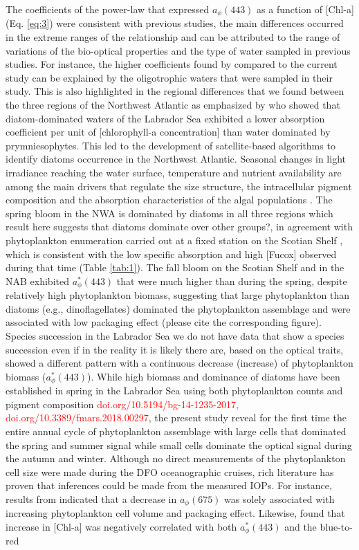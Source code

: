 \documentclass[utf8]{frontiersSCNS} %
\begin{document}
The coefficients of the power-law that expressed $a_\phi(443)$ as a function of [Chl-a] (Eq. \ref{eq:3}) were consistent with previous studies, the main differences occurred in the extreme ranges of the relationship and can be attributed to the range of variations of the bio-optical properties and the type of water sampled in previous studies. For instance, the higher coefficients found by \cite{bricaud2005} compared to the current study can be explained by the oligotrophic waters that were sampled in their study. This is also highlighted in the regional differences that we found between the three regions of the Northwest Atlantic as emphasized by \cite{stuart2000} who showed that diatom-dominated waters of the Labrador Sea exhibited a lower absorption coefficient per unit of [chlorophyll-a concentration] than water dominated by prymniesophytes. This led to the development of satellite-based algorithms to identify diatoms occurrence \citep{sathyendranath2004} in the Northwest Atlantic. Seasonal changes in light irradiance reaching the water surface, temperature and nutrient availability are among the main drivers that regulate the size structure, the intracellular pigment composition and the absorption characteristics of the algal populations \citep{Ciotti2002,Bricaud2004,Churilova2017}.  The spring bloom in the NWA is dominated by diatoms in all three regions which result here suggests that diatoms dominate over other groups?, in agreement with phytoplankton enumeration carried out at a fixed station on the Scotian Shelf \citep{casault2020}, which is consistent with the low specific absorption and high [Fucox] observed during that time (Table \ref{tab:1}). The fall bloom on the Scotian Shelf and in the NAB exhibited $a^*_\phi(443)$ that were much higher than during the spring, despite relatively high phytoplankton biomass, suggesting that large phytoplankton than diatoms (e.g., dinoflagellates) dominated the phytoplankton assemblage and were associated with low packaging effect (please cite the corresponding figure). Species succession in the Labrador Sea we do not have data that show a species succession even if in the reality it is likely there are, based on the optical traits, showed a different pattern with a continuous decrease (increase) of phytoplankton biomass ($a^*_\phi(443)$). While high biomass and dominance of diatoms have been established in spring in the Labrador Sea using both phytoplankton counts and pigment composition \citep{fragoso2017,fragoso2018} \textcolor{red}{doi.org/10.5194/bg-14-1235-2017, doi.org/10.3389/fmars.2018.00297}, the present study reveal for the first time the entire annual cycle of phytoplankton assemblage with large cells that dominated the spring and summer signal while small cells dominate the optical signal during the autumn and winter. Although no direct measurements of the phytoplankton cell size were made during the DFO oceanographic cruises, rich literature has proven that inferences could be made from the measured IOPs. For instance, results from \cite{Fujiki2002} indicated that a decrease in $a_\phi(675)$ was solely associated with increasing phytoplankton cell volume and packaging effect. Likewise, \cite{Bricaud1995} found that increase in [Chl-a] was negatively correlated with both $a^*_\phi(443)$ and the blue-to-red 
\end{document}
